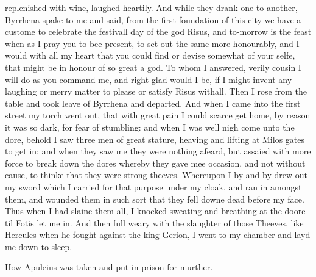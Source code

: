 replenished with wine, laughed heartily. And while they drank one to another,
Byrrhena spake to me and said, from the first foundation of this city we have a
custome to celebrate the festivall day of the god Risus, and to-morrow is the
feast when as I pray you to bee present, to set out the same more honourably,
and I would with all my heart that you could find or devise somewhat of your
selfe, that might be in honour of so great a god. To whom I answered, verily
cousin I will do as you command me, and right glad would I be, if I might
invent any laughing or merry matter to please or satisfy Risus withall. Then I
rose from the table and took leave of Byrrhena and departed. And when I came
into the first street my torch went out, that with great pain I could scarce
get home, by reason it was so dark, for fear of stumbling: and when I was well
nigh come unto the dore, behold I saw three men of great stature, heaving and
lifting at Milos gates to get in: and when they saw me they were nothing
afeard, but assaied with more force to break down the dores whereby they gave
mee occasion, and not without cause, to thinke that they were strong theeves.
Whereupon I by and by drew out my sword which I carried for that purpose under
my cloak, and ran in amongst them, and wounded them in such sort that they fell
downe dead before my face. Thus when I had slaine them all, I knocked sweating
and breathing at the doore til Fotis let me in. And then full weary with the
slaughter of those Theeves, like Hercules when he fought against the king
Gerion, I went to my chamber and layd me down to sleep.



How Apuleius was taken and put in prison for murther.

